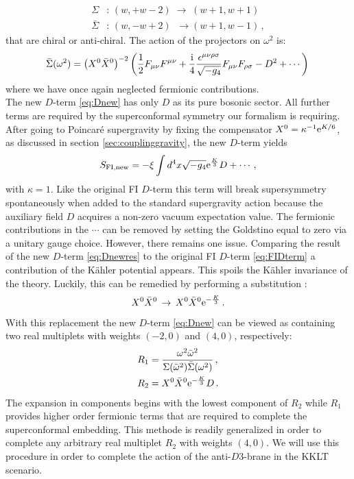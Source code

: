 \documentclass[12pt]{report}
\newcommand{\be}{\begin{equation}}
\newcommand{\ee}{\end{equation}}
\newcommand{\bea}{\begin{equation}\begin{aligned}}
\newcommand{\eea}{\end{aligned}\end{equation}}
\def\rmi{{\rm i}}
\def\rme{{\rm e}}
\begin{document}
\bea 
\Sigma&:\,(w,+w-2)\; \to \;(w+1,w+1)\\
\bar{\Sigma}&:\,(w,-w+2)\; \;\to (w+1,w-1)\,,
\eea
that are chiral or anti-chiral. The action of the projectors on $\omega^2$ is:
\be 
\bar{\Sigma}(\omega^2)=\left(X^0\bar{X}^0\right)^{-2} \left(\frac{1}{2}F_{\mu\nu}F^{\mu\nu}+\frac{\rmi}{4}\frac{\epsilon^{\mu\nu\rho\sigma}}{\sqrt{-g_4}}F_{\mu\nu}F_{\rho\sigma}-D^2 + \cdots\right)\,
\ee
where we have once again neglected fermionic contributions.\\
The new $D$-term \eqref{eq:Dnew} has only $D$ as its pure bosonic sector. All further terms are required by the superconformal symmetry our formalism is requiring. After going to Poincar\'{e} supergravity by fixing the compensator $X^0 = \kappa^{-1} \rme^{K/6}$, as discussed in section \ref{sec:couplinggravity}, the new $D$-term yields
\be 
S_{\text{FI,new}} = -\xi \int d^4x \sqrt{-g_4} \rme^{\frac{K}{3}}D + \cdots\,,
\label{eq:Dnewres}
\ee
with $\kappa = 1$. Like the original FI $D$-term this term will break supersymmetry spontaneously when added to the standard supergravity action because the auxiliary field $D$ acquires a non-zero vacuum expectation value. The fermionic contributions in the $\cdots$ can be removed by setting the Goldstino equal to zero via a unitary gauge choice. However, there remains one issue. Comparing the result of the new $D$-term \eqref{eq:Dnewres} to the original FI $D$-term \eqref{eq:FIDterm} a contribution of the Kähler potential appears. This spoils the Kähler invariance of the theory. Luckily, this can be remedied by performing a substitution \cite{Antoniadis:2018oeh}:
\be 
X^0 \bar{X}^0 \,\to\,X^0\bar{X}^0 \rme^{-\frac{K}{3}}\,.
\ee
With this replacement the new $D$-term \eqref{eq:Dnew} can be viewed as containing two real multiplets with weights $(-2,0)$ and $(4,0)$, respectively:
\bea 
R_1 &=\frac{\omega^2\bar{\omega}^2}{\Sigma(\bar{\omega}^2)\bar{\Sigma}(\omega^2)}\,,\\
R_2 &= X^0\bar{X}^0 \rme^{-\frac{K}{3}}D\,.
\eea
The expansion in components begins with the lowest component of $R_2$ while $R_1$ provides higher order fermionic terms that are required to complete the superconformal embedding. This methode is readily generalized in order to complete any arbitrary real multiplet $R_2$ with weights $(4,0)$. We will use this procedure in order to complete the action of the anti-$D3$-brane in the KKLT scenario.
\end{document}
